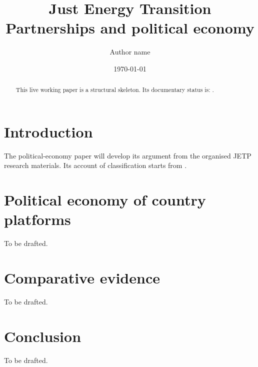 \documentclass[11pt]{article}
\title{Just Energy Transition Partnerships and political economy}
\author{Author name}
\date{\today}
\begin{document}
\maketitle

\begin{abstract}
This live working paper is a structural skeleton. Its documentary status is:
\JetpDataStatus.
\end{abstract}

\section{Introduction}
The political-economy paper will develop its argument from the organised JETP
research materials. Its account of classification starts from
\citet{desrosieres1993}.

\section{Political economy of country platforms}
To be drafted.

\section{Comparative evidence}
To be drafted.

\section{Conclusion}
To be drafted.



\end{document}
